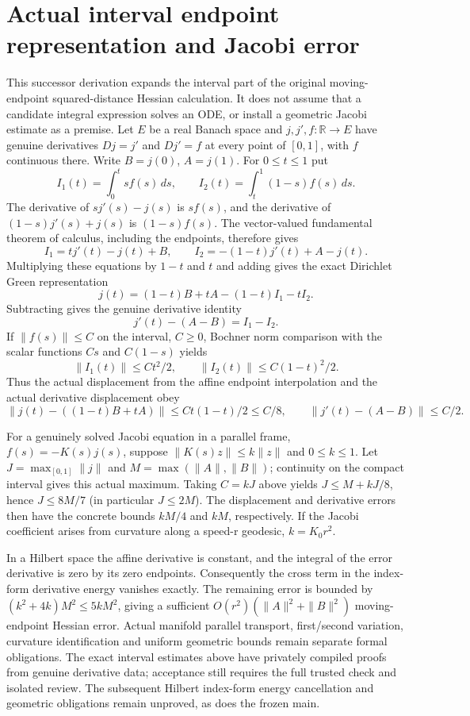 \documentclass[11pt]{article}
\theoremstyle{definition}
\theoremstyle{remark}
\numberwithin{equation}{section}
\begin{document}
\section{Actual interval endpoint representation and Jacobi error}\label{jacobi-interval:moments}\label{jacobi-interval:representation}\label{jacobi-interval:moment-bounds}\label{jacobi-interval:green-bounds}\label{jacobi-interval:small-coefficient}
This successor derivation expands the interval part of the original
moving-endpoint squared-distance Hessian calculation. It does not assume
that a candidate integral expression solves an ODE, or install a geometric
Jacobi estimate as a premise.
Let $E$ be a real Banach space and $j,j',f:\mathbb R\to E$ have genuine
derivatives $Dj=j'$ and $Dj'=f$ at every point of $[0,1]$, with $f$
continuous there. Write $B=j(0)$, $A=j(1)$. For $0\le t\le1$ put
\[
 I_1(t)=\int_0^t s f(s)\,ds,\qquad
 I_2(t)=\int_t^1(1-s)f(s)\,ds.
\]
The derivative of $s j'(s)-j(s)$ is $s f(s)$, and the derivative of
$(1-s)j'(s)+j(s)$ is $(1-s)f(s)$. The vector-valued fundamental theorem
of calculus, including the endpoints, therefore gives
\[
 I_1=tj'(t)-j(t)+B,\qquad
 I_2=-(1-t)j'(t)+A-j(t).
\]
Multiplying these equations by $1-t$ and $t$ and adding gives the exact
Dirichlet Green representation
\[
 j(t)=(1-t)B+tA-(1-t)I_1-tI_2.
\]
Subtracting gives the genuine derivative identity
\[
 j'(t)-(A-B)=I_1-I_2.
\]
If $\|f(s)\|\le C$ on the interval, $C\ge0$, Bochner norm comparison
with the scalar functions $Cs$ and $C(1-s)$ yields
\[
 \|I_1(t)\|\le Ct^2/2,\qquad
 \|I_2(t)\|\le C(1-t)^2/2.
\]
Thus the actual displacement from the affine endpoint interpolation and
the actual derivative displacement obey
\[
 \|j(t)-((1-t)B+tA)\|\le Ct(1-t)/2\le C/8,
 \qquad\|j'(t)-(A-B)\|\le C/2.
\]

For a genuinely solved Jacobi equation in a parallel frame,
$f(s)=-K(s)j(s)$, suppose $\|K(s)z\|\le k\|z\|$ and
$0\le k\le1$. Let $J=\max_{[0,1]}\|j\|$ and
$M=\max(\|A\|,\|B\|)$; continuity on the compact interval gives this
actual maximum. Taking $C=kJ$ above yields
$J\le M+kJ/8$, hence $J\le8M/7$ (in particular $J\le2M$).
The displacement and derivative errors then have the concrete bounds
$kM/4$ and $kM$, respectively. If the Jacobi coefficient arises from
curvature along a speed-r geodesic, $k=K_0r^2$.

In a Hilbert space the affine derivative is constant, and the integral
of the error derivative is zero by its zero endpoints. Consequently the
cross term in the index-form derivative energy vanishes exactly. The
remaining error is bounded by $(k^2+4k)M^2\le5kM^2$, giving a sufficient
$O(r^2)(\|A\|^2+\|B\|^2)$ moving-endpoint Hessian error. Actual manifold
parallel transport, first/second variation, curvature identification and
uniform geometric bounds remain separate formal obligations. The exact interval estimates above have privately compiled proofs from genuine derivative data; acceptance still requires the full trusted check and isolated review. The subsequent Hilbert index-form energy cancellation and geometric obligations remain unproved, as does the frozen main.
\end{document}
